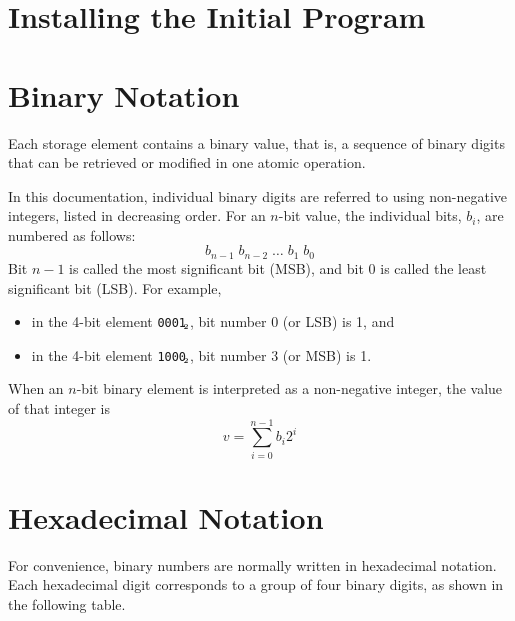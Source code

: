 \documentclass[a4paper,12pt]{article}
\newcommand{\num}[1]{\texttt{#1}\xspace}
\newcommand{\bin}[1]{\num{#1}$_{\textup{\tiny\hskip-1ex 2}}$\xspace}
\begin{document}
\section{Installing the Initial Program}

\appendix

\section{Binary Notation}
\label{sec:binary-notation}

Each storage element contains a binary value, that is, a sequence of binary digits that can be retrieved or modified in one atomic operation.

In this documentation, individual binary digits are referred to using non-negative integers, listed in decreasing order.
For an $n$-bit value, the individual bits, $b_i$, are numbered as follows:
\[ b_{n-1} \; b_{n-2} \; \ldots \; b_{1} \; b_{0} \]
Bit $n-1$ is called the most significant bit (MSB), and bit 0 is called the least significant bit (LSB).
For example,
\begin{itemize}
\item in the 4-bit element \bin{0001}, bit number 0 (or LSB) is 1, and
\item in the 4-bit element \bin{1000}, bit number 3 (or MSB) is 1.
\end{itemize}

When an $n$-bit binary element is interpreted as a non-negative integer, the value of that integer is
\[
    v = \sum_{i=0}^{n-1} b_{i}2^{i}
\]

\section{Hexadecimal Notation}
\label{sec:hexadecimal-notation}

For convenience, binary numbers are normally written in hexadecimal notation.
Each hexadecimal digit corresponds to a group of four binary digits, as shown in the following table.
\end{document}
